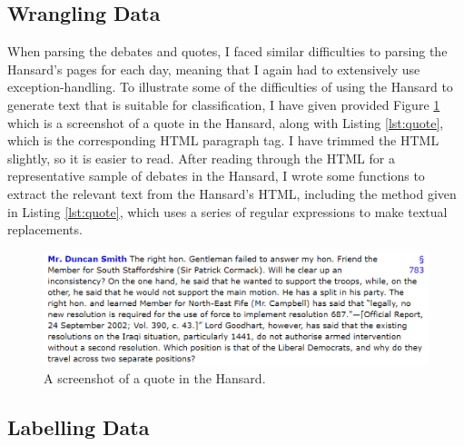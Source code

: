 \documentclass[12pt,a4paper,twoside,openright]{report}
\newcommand{\mylisting}[4]{}
\newcommand{\pylisting}[2]{\mylisting{Python}{py}{#1}{#2}}
\newcommand{\htmllisting}[2]{\mylisting{HTML}{html}{#1}{#2}}
\begin{document}
\subsection{Wrangling Data} \label{impl-wrangling}
When parsing the debates and quotes, I faced similar difficulties to parsing the Hansard's pages for each day, meaning that I again had to extensively use exception-handling. To illustrate some of the difficulties of using the Hansard to generate text that is suitable for classification, I have given provided Figure \ref{fig:hansardquote} which is a screenshot of a quote in the Hansard, along with Listing \ref{lst:quote}, which is the corresponding HTML paragraph tag. I have trimmed the HTML slightly, so it is easier to read. After reading through the HTML for a representative sample of debates in the Hansard, I wrote some functions to extract the relevant text from the Hansard's HTML, including the method given in Listing \ref{lst:quote}, which uses a series of regular expressions to make textual replacements.

\begin{figure}
	\includegraphics[width=\linewidth]{figs/idsquote.png}
	\caption{A screenshot of a quote in the Hansard.}
	\label{fig:hansardquote}
\end{figure}

\htmllisting{HTML paragraph tag of the quote in Figure \ref{fig:hansardquote}.}{quote}

\pylisting{Python code using regular expressions to clean the text from a paragraph tag.}{get_paragraph_text}
\subsection{Labelling Data} \label{impl-labelling}
\end{document}
